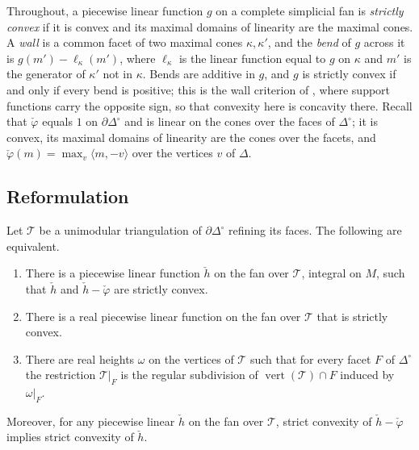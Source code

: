 Throughout, a piecewise linear function $g$ on a complete simplicial fan is \emph{strictly convex} if it is convex and its
maximal domains of linearity are the maximal cones. A \emph{wall} is a common facet of two maximal cones $\kappa,\kappa'$,
and the \emph{bend} of $g$ across it is $g(m')-\ell_\kappa(m')$, where $\ell_\kappa$ is the linear function equal to $g$ on
$\kappa$ and $m'$ is the generator of $\kappa'$ not in $\kappa$. Bends are additive in $g$, and $g$ is strictly convex if
and only if every bend is positive; this is the wall criterion of \cite[\S6.1]{CLS}, where support functions carry the
opposite sign, so that convexity here is concavity there. Recall that $\check\varphi$ equals $1$ on $\partial\Delta^\circ$ and is
linear on the cones over the faces of $\Delta^\circ$; it is convex, its maximal domains of linearity are the cones over the
facets, and $\check\varphi(m)=\max_v\langle m,-v\rangle$ over the vertices $v$ of $\Delta$.

\subsection{Reformulation}\label{ssec:ureform}

\begin{lemma}\label{lem:Ureform}
Let $\mathcal T$ be a unimodular triangulation of $\partial\Delta^\circ$ refining its faces. The following are
equivalent.
\begin{enumerate}
\item[(a)] There is a piecewise linear function $\check h$ on the fan over $\mathcal T$, integral on $M$, such that $\check h$ and
$\check h-\check\varphi$ are strictly convex.
\item[(b)] There is a real piecewise linear function on the fan over $\mathcal T$ that is strictly convex.
\item[(c)] There are real heights $\omega$ on the vertices of $\mathcal T$ such that for every facet $F$ of $\Delta^\circ$ the
restriction $\mathcal T|_F$ is the regular subdivision of $\operatorname{vert}(\mathcal T)\cap F$ induced by $\omega|_F$.
\end{enumerate}
Moreover, for any piecewise linear $\check h$ on the fan over $\mathcal T$, strict convexity of $\check h-\check\varphi$
implies strict convexity of $\check h$.
\end{lemma}

